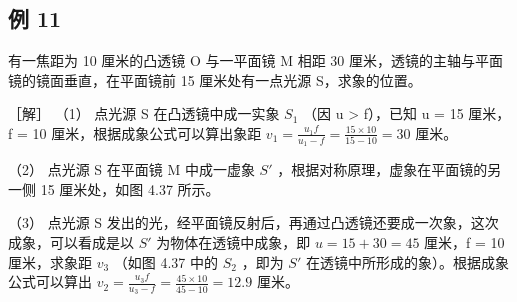 \subsection{例 11}

有一焦距为 10 厘米的凸透镜 O 与一平面镜 M 相距 30
厘米，透镜的主轴与平面镜的镜面垂直，在平面镜前 15 厘米处有一点光源
S，求象的位置。

［解］ （1） 点光源 S 在凸透镜中成一实象 \(S_{1}\) （因 u \textgreater{}
f），已知 u = 15 厘米，f = 10 厘米，根据成象公式可以算出象距
\(v_{1} = \frac{u_{1}f}{u_{1} - f} = \frac{15 \times 10}{15 - 10} = 30\)
厘米。

（2） 点光源 S 在平面镜 M 中成一虚象 \(S'\)
，根据对称原理，虚象在平面镜的另一侧 15 厘米处，如图 4.37 所示。

（3） 点光源 S
发出的光，经平面镜反射后，再通过凸透镜还要成一次象，这次成象，可以看成是以
\(S'\) 为物体在透镜中成象，即 \(u = 15 + 30 = 45\) 厘米，f = 10
厘米，求象距 \(v_{3}\) （如图 4.37 中的 \(S_{2}\) ，即为 \(S'\)
在透镜中所形成的象）。根据成象公式可以算出
\(v_{2} = \frac{u_{3}f}{u_{3} - f} = \frac{45 \times 10}{45 - 10} = 12.9\)
厘米。

